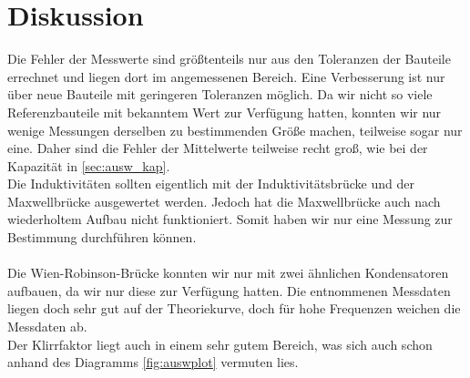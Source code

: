 \section{Diskussion}
\label{sec:Diskussion}
Die Fehler der Messwerte sind größtenteils nur aus den Toleranzen der Bauteile errechnet und liegen dort im angemessenen Bereich.
Eine Verbesserung ist nur über neue Bauteile mit geringeren Toleranzen möglich.
Da wir nicht so viele Referenzbauteile mit bekanntem Wert zur Verfügung hatten, konnten wir nur wenige Messungen derselben zu bestimmenden Größe machen, teilweise sogar nur eine.
Daher sind die Fehler der Mittelwerte teilweise recht groß, wie bei der Kapazität in \ref{sec:ausw_kap}.\\
Die Induktivitäten sollten eigentlich mit der Induktivitätsbrücke und der Maxwellbrücke ausgewertet werden.
Jedoch hat die Maxwellbrücke auch nach wiederholtem Aufbau nicht funktioniert.
Somit haben wir nur eine Messung zur Bestimmung durchführen können.\\
\\
Die Wien-Robinson-Brücke konnten wir nur mit zwei ähnlichen Kondensatoren aufbauen, da wir nur diese zur Verfügung hatten.
Die entnommenen Messdaten liegen doch sehr gut auf der Theoriekurve, doch für hohe Frequenzen weichen die Messdaten ab.\\
Der Klirrfaktor liegt auch in einem sehr gutem Bereich, was sich auch schon anhand des Diagramms \ref{fig:auswplot} vermuten lies.
